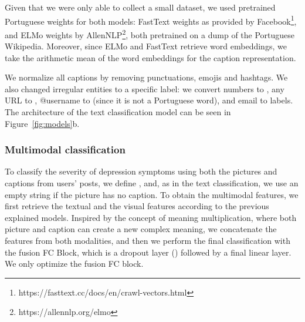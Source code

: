 \documentclass[letterpaper]{article} \usepackage{aaai20}  \usepackage{times}  \usepackage{helvet} \usepackage{courier}  \usepackage[hyphens]{url}  \usepackage{graphicx} \urlstyle{rm} \def\UrlFont{\rm}  \usepackage{graphicx}  \frenchspacing  \setlength{\pdfpagewidth}{8.5in}  \setlength{\pdfpageheight}{11in}  \usepackage[final]{changes}
\begin{document}
Given that we were only able to collect a small dataset, we used pretrained Portuguese weights for both models: FastText weights as provided by Facebook\footnote{https://fasttext.cc/docs/en/crawl-vectors.html}, and ELMo weights by AllenNLP\footnote{https://allennlp.org/elmo}, both pretrained on a dump of the Portuguese Wikipedia. Moreover, since ELMo and FastText retrieve word embeddings, we take the arithmetic mean of the word embeddings for the caption representation.

We normalize all captions by removing punctuations, emojis and hashtags. We also changed irregular entities to a specific label: we convert numbers to , any URL to , @username to  (since it is not a Portuguese word), and email to  labels. The  architecture of the text classification model can be seen in Figure~\ref{fig:models}b.

\subsubsection{Multimodal classification} To classify the severity of depression symptoms using both the pictures and captions from users' posts, we define , and, as in the text classification, we use an empty string if the picture  has no caption. To obtain the multimodal features, we first retrieve the textual and the visual features according to the previous explained models. Inspired by the concept of meaning multiplication, where both picture and caption can create a new complex meaning, we concatenate the features from both modalities, and then we perform the final classification with the fusion FC Block, which is a dropout layer () followed by a final linear layer. We only optimize the fusion FC block.
\end{document}
